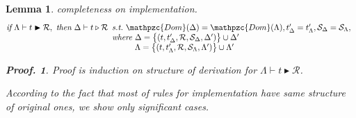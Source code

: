\documentclass[12pt]{article}
\newtheorem{Lemma}{Lemma}[section]
\newtheorem{Proof}{Proof.}
\begin{document}
\begin{Lemma}{completeness on implementation.}
  \label{completeness_on_implementation}
  \[ \text{\it if}\ \Lambda \vdash t \blacktriangleright \mathcal{R},\
      \text{\it then}\ \Delta \vdash t \triangleright \mathcal{R}
       \begin{array}[t]{l}
         \text{\it s.t.}\ \mathpzc{Dom}(\Delta) = \mathpzc{Dom}(\Lambda),
          t'_\Delta = t'_\Lambda,
           \mathcal{S}_\Delta = \mathcal{S}_\Lambda,  \\           
         \text{\it where} \!\begin{array}[t]{l}
           \Delta = \bigl\{(t, t'_\Delta, \mathcal{R},
            \mathcal{S}_\Delta, \Delta') \bigr\} \cup \Delta'  \\
           \Lambda = \bigl\{(t, t'_\Lambda, \mathcal{R},
            \mathcal{S}_\Lambda, \Lambda') \bigr\} \cup \Lambda'
         \end{array}
       \end{array}
  \]
  \begin{Proof}
    Proof is induction on structure of derivation for
    $\Lambda \vdash t \blacktriangleright \mathcal{R}$.
    
    According to the fact that most of rules for implementation have same
    structure of original ones, we show only significant cases.
    

\end{Proof}
\end{Lemma}
\end{document}
